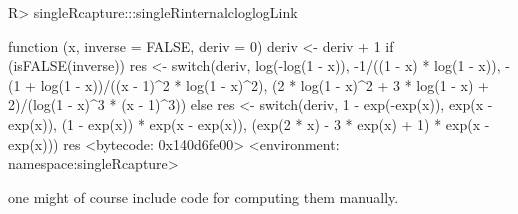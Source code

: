 \documentclass[
]{jss}
\newcommand{\1}{\mathcal{I}} \newcommand{\bZero}{\boldsymbol{0}}
\begin{document}
\begin{CodeChunk}
\begin{CodeInput}
R> singleRcapture:::singleRinternalcloglogLink
\end{CodeInput}
\begin{CodeOutput}
function (x, inverse = FALSE, deriv = 0) 
{
    deriv <- deriv + 1
    if (isFALSE(inverse)) {
        res <- switch(deriv, log(-log(1 - x)), -1/((1 - x) * 
            log(1 - x)), -(1 + log(1 - x))/((x - 1)^2 * log(1 - 
            x)^2), (2 * log(1 - x)^2 + 3 * log(1 - x) + 2)/(log(1 - 
            x)^3 * (x - 1)^3))
    }
    else {
        res <- switch(deriv, 1 - exp(-exp(x)), exp(x - exp(x)), 
            (1 - exp(x)) * exp(x - exp(x)), (exp(2 * x) - 3 * 
                exp(x) + 1) * exp(x - exp(x)))
    }
    res
}
<bytecode: 0x140d6fe00>
<environment: namespace:singleRcapture>
\end{CodeOutput}
\end{CodeChunk}

\normalsize

one might of course include code for computing them manually.


\end{document}
